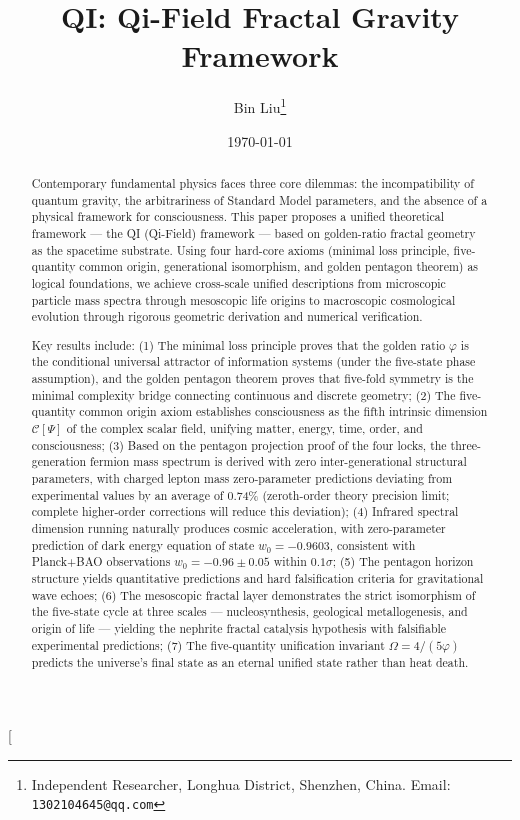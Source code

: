 \documentclass[12pt,a4paper,twocolumn]{article}
\renewcommand{\phi}{\varphi}
\begin{document}
\twocolumn[{
\begin{@twocolumnfalse}
\centering
\title{\LARGE\bfseries QI: Qi-Field Fractal Gravity Framework}
\author{Bin Liu\thanks{Independent Researcher, Longhua District, Shenzhen, China. Email: \texttt{1302104645@qq.com}}}
\date{\today}
\maketitle

\begin{abstract}
Contemporary fundamental physics faces three core dilemmas: the incompatibility of quantum gravity, the arbitrariness of Standard Model parameters, and the absence of a physical framework for consciousness. This paper proposes a unified theoretical framework --- the QI (Qi-Field) framework --- based on golden-ratio fractal geometry as the spacetime substrate. Using four hard-core axioms (minimal loss principle, five-quantity common origin, generational isomorphism, and golden pentagon theorem) as logical foundations, we achieve cross-scale unified descriptions from microscopic particle mass spectra through mesoscopic life origins to macroscopic cosmological evolution through rigorous geometric derivation and numerical verification.

Key results include: (1) The minimal loss principle proves that the golden ratio $\phi$ is the conditional universal attractor of information systems (under the five-state phase assumption), and the golden pentagon theorem proves that five-fold symmetry is the minimal complexity bridge connecting continuous and discrete geometry; (2) The five-quantity common origin axiom establishes consciousness as the fifth intrinsic dimension $\mathcal{C}[\Psi]$ of the complex scalar field, unifying matter, energy, time, order, and consciousness; (3) Based on the pentagon projection proof of the four locks, the three-generation fermion mass spectrum is derived with zero inter-generational structural parameters, with charged lepton mass zero-parameter predictions deviating from experimental values by an average of 0.74\% (zeroth-order theory precision limit; complete higher-order corrections will reduce this deviation); (4) Infrared spectral dimension running naturally produces cosmic acceleration, with zero-parameter prediction of dark energy equation of state $w_0=-0.9603$, consistent with Planck+BAO observations $w_0=-0.96\pm0.05$ within $0.1\sigma$; (5) The pentagon horizon structure yields quantitative predictions and hard falsification criteria for gravitational wave echoes; (6) The mesoscopic fractal layer demonstrates the strict isomorphism of the five-state cycle at three scales --- nucleosynthesis, geological metallogenesis, and origin of life --- yielding the nephrite fractal catalysis hypothesis with falsifiable experimental predictions; (7) The five-quantity unification invariant $\Omega=4/(5\phi)$ predicts the universe's final state as an eternal unified state rather than heat death.


\end{abstract}
\end{@twocolumnfalse}}
\end{document}
